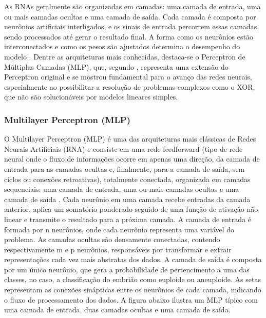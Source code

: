 As RNAs geralmente são organizadas em camadas: uma camada de entrada, uma ou mais camadas ocultas e uma camada de saída. Cada camada é composta por neurônios artificiais interligados, e os sinais de entrada percorrem essas camadas, sendo processados até gerar o resultado final. A forma como os neurônios estão interconectados e como os pesos são ajustados determina o desempenho do modelo \cite{haykin2009}. Dentre as arquiteturas mais conhecidas, destaca-se o Perceptron de Múltiplas Camadas (MLP), que, segundo , representa uma extensão do Perceptron original e se mostrou fundamental para o avanço das redes neurais, especialmente ao possibilitar a resolução de problemas complexos como o XOR, que não são solucionáveis por modelos lineares simples.

\subsubsection{Multilayer Perceptron (MLP)}

O Multilayer Perceptron (MLP) é uma das arquiteturas mais clássicas de Redes Neurais Artificiais (RNA) e consiste em uma rede feedforward (tipo de rede neural onde o fluxo de informações ocorre em apenas uma direção, da camada de entrada para as camadas ocultas e, finalmente, para a camada de saída, sem ciclos ou conexões retroativas), totalmente conectada, organizada em camadas sequenciais: uma camada de entrada, uma ou mais camadas ocultas e uma camada de saída \cite{haykin2009}. Cada neurônio em uma camada recebe entradas da camada anterior, aplica um somatório ponderado seguido de uma função de ativação não linear e transmite o resultado para a próxima camada. A camada de entrada é formada por n neurônios, onde cada neurônio representa uma variável do problema. As camadas ocultas são densamente conectadas, contendo respectivamente m e p neurônios, responsáveis por transformar e extrair representações cada vez mais abstratas dos dados. A camada de saída é composta por um único neurônio, que gera a probabilidade de pertencimento a uma das classes, no caso, a classificação do embrião como euploide ou aneuploide. As setas representam as conexões sinápticas entre os neurônios de cada camada, indicando o fluxo de processamento dos dados. A figura abaixo ilustra um MLP típico com uma camada de entrada, duas camadas ocultas e uma camada de saída.

